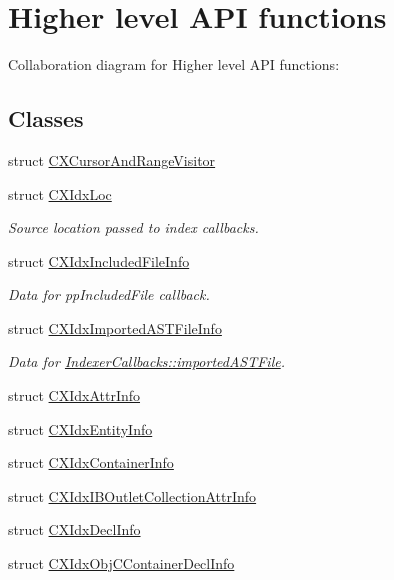 \hypertarget{group__CINDEX__HIGH}{}\section{Higher level A\+PI functions}
\label{group__CINDEX__HIGH}
Collaboration diagram for Higher level A\+PI functions\+:
\subsection*{Classes}
\begin{DoxyCompactItemize}
\item 
struct \hyperlink{structCXCursorAndRangeVisitor}{C\+X\+Cursor\+And\+Range\+Visitor}
\item 
struct \hyperlink{structCXIdxLoc}{C\+X\+Idx\+Loc}
\begin{DoxyCompactList}\small\item\em Source location passed to index callbacks. \end{DoxyCompactList}\item 
struct \hyperlink{structCXIdxIncludedFileInfo}{C\+X\+Idx\+Included\+File\+Info}
\begin{DoxyCompactList}\small\item\em Data for pp\+Included\+File callback. \end{DoxyCompactList}\item 
struct \hyperlink{structCXIdxImportedASTFileInfo}{C\+X\+Idx\+Imported\+A\+S\+T\+File\+Info}
\begin{DoxyCompactList}\small\item\em Data for \hyperlink{structIndexerCallbacks_a75672a9934f69854080bee3fbc0e3994}{Indexer\+Callbacks\+::imported\+A\+S\+T\+File}. \end{DoxyCompactList}\item 
struct \hyperlink{structCXIdxAttrInfo}{C\+X\+Idx\+Attr\+Info}
\item 
struct \hyperlink{structCXIdxEntityInfo}{C\+X\+Idx\+Entity\+Info}
\item 
struct \hyperlink{structCXIdxContainerInfo}{C\+X\+Idx\+Container\+Info}
\item 
struct \hyperlink{structCXIdxIBOutletCollectionAttrInfo}{C\+X\+Idx\+I\+B\+Outlet\+Collection\+Attr\+Info}
\item 
struct \hyperlink{structCXIdxDeclInfo}{C\+X\+Idx\+Decl\+Info}
\item 
struct \hyperlink{structCXIdxObjCContainerDeclInfo}{C\+X\+Idx\+Obj\+C\+Container\+Decl\+Info}

\end{DoxyCompactItemize}
